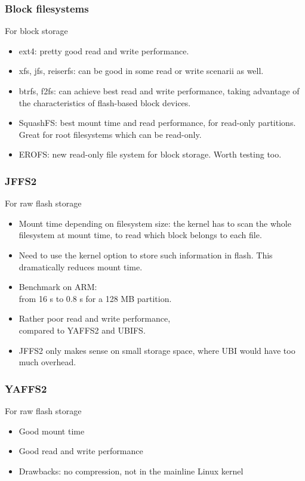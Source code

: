 \begin{frame}
\frametitle{Block filesystems}
For block storage
\begin{itemize}
\item ext4: pretty good read and write performance.
\item xfs, jfs, reiserfs: can be good in some read or write scenarii
      as well.
\item btrfs, f2fs: can achieve best read and write performance,
      taking advantage of the characteristics of flash-based block
      devices.
\item SquashFS: best mount time and read performance, for read-only
      partitions. Great for root filesystems which can be read-only.
\item EROFS: new read-only file system for block storage. Worth
      testing too.
\end{itemize}
\end{frame}

\begin{frame}
\frametitle{JFFS2}
For raw flash storage
\begin{itemize}
\item Mount time depending on filesystem size: the kernel has to
      scan the whole filesystem at mount time, to read which block
      belongs to each file.
\item Need to use the  kernel option
      to store such information in flash. This dramatically reduces
      mount time.
\item Benchmark on ARM:\\
      from 16 s to 0.8 s for a 128 MB partition.
\item Rather poor read and write performance,\\
      compared to YAFFS2 and UBIFS.
\item JFFS2 only makes sense on small storage space,
      where UBI would have too much overhead.
\end{itemize}
\end{frame}

\begin{frame}
\frametitle{YAFFS2}
For raw flash storage
\begin{itemize}
\item Good mount time
\item Good read and write performance
\item Drawbacks: no compression, not in the mainline Linux kernel
\end{itemize}
\end{frame}

